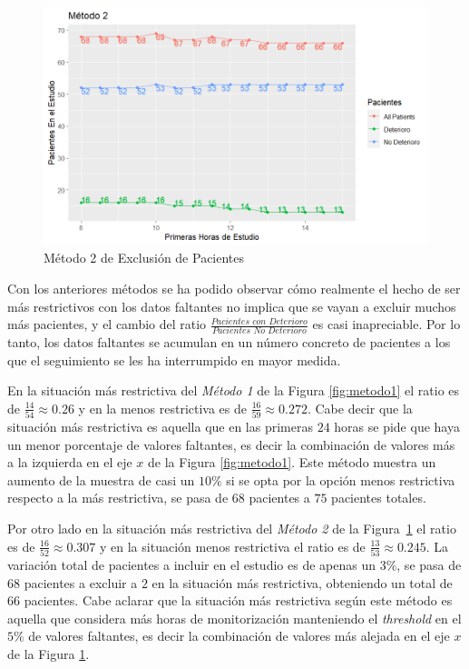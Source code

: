\begin{figure}[H]
    \centering
    \includegraphics[scale = 1]{./img/metodo2.png}
    \caption{Método 2 de Exclusión de Pacientes}
    \label{fig:metodo2}
\end{figure}

Con los anteriores métodos se ha podido observar cómo realmente el hecho de ser más restrictivos con los datos faltantes no implica que se vayan a excluir muchos más pacientes, y el cambio del ratio $\frac{\textit{Pacientes con Deterioro}}{\textit{Pacientes No Deterioro}}$ es casi inapreciable. Por lo tanto, los datos faltantes se acumulan en un número concreto de pacientes a los que el seguimiento se les ha interrumpido en mayor medida.

En la situación más restrictiva del \textit{Método 1} de la Figura \ref{fig:metodo1} el ratio es de $ \frac{14}{54} \approx 0.26$ y en la menos restrictiva es de $ \frac{16}{59} \approx 0.272$. Cabe decir que la situación más restrictiva es aquella que en las primeras $24$ horas se pide que haya un menor porcentaje de valores faltantes, es decir la combinación de valores más a la izquierda en el eje $x$ de la Figura \ref{fig:metodo1}. Este método muestra un aumento de la muestra de casi un $10 \%$ si se opta por la opción menos restrictiva respecto a la más restrictiva, se pasa de $68$ pacientes a $75$ pacientes totales. 

Por otro lado en la situación más restrictiva del \textit{Método 2} de la Figura~\ref{fig:metodo2} el ratio es de $ \frac{16}{52} \approx 0.307$ y en la situación menos restrictiva el ratio es de $ \frac{13}{53} \approx 0.245$. La variación total de pacientes a incluir en el estudio es de apenas un $3 \%$, se pasa de $68$ pacientes a excluir a $2$ en la situación más restrictiva, obteniendo un total de $66$ pacientes. Cabe aclarar que la situación más restrictiva según este método es aquella que considera más horas de monitorización manteniendo el \textit{threshold} en el $5 \%$ de valores faltantes, es decir la combinación de valores más alejada en el eje $x$ de la Figura \ref{fig:metodo2}.

